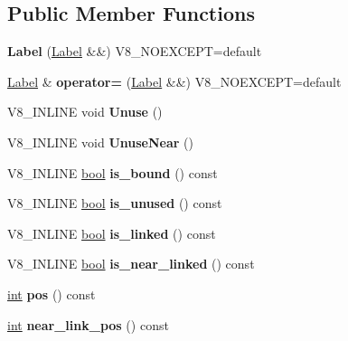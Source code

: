 \subsection*{Public Member Functions}
\begin{DoxyCompactItemize}
\item 
\mbox{\label{classv8_1_1internal_1_1Label_afd6e4efd594123dca09886540a98c827}} 
{\bfseries Label} (\mbox{\hyperlink{classv8_1_1internal_1_1Label}{Label}} \&\&) V8\+\_\+\+N\+O\+E\+X\+C\+E\+PT=default
\item 
\mbox{\label{classv8_1_1internal_1_1Label_a626fe1cbe2506760bfc536fc6ff1b01a}} 
\mbox{\hyperlink{classv8_1_1internal_1_1Label}{Label}} \& {\bfseries operator=} (\mbox{\hyperlink{classv8_1_1internal_1_1Label}{Label}} \&\&) V8\+\_\+\+N\+O\+E\+X\+C\+E\+PT=default
\item 
\mbox{\label{classv8_1_1internal_1_1Label_ab0f5ce9a92345aca188bbc3fdb35e093}} 
V8\+\_\+\+I\+N\+L\+I\+NE void {\bfseries Unuse} ()
\item 
\mbox{\label{classv8_1_1internal_1_1Label_aad88255cdf3ad753e4a004b74ac9bb7b}} 
V8\+\_\+\+I\+N\+L\+I\+NE void {\bfseries Unuse\+Near} ()
\item 
\mbox{\label{classv8_1_1internal_1_1Label_af4b1bc535d3a7527cd84f1d027b03066}} 
V8\+\_\+\+I\+N\+L\+I\+NE \mbox{\hyperlink{classbool}{bool}} {\bfseries is\+\_\+bound} () const
\item 
\mbox{\label{classv8_1_1internal_1_1Label_a186bd129567553c8124668a5fd3f735f}} 
V8\+\_\+\+I\+N\+L\+I\+NE \mbox{\hyperlink{classbool}{bool}} {\bfseries is\+\_\+unused} () const
\item 
\mbox{\label{classv8_1_1internal_1_1Label_ab0f9bcf1d4b23420911717b584811250}} 
V8\+\_\+\+I\+N\+L\+I\+NE \mbox{\hyperlink{classbool}{bool}} {\bfseries is\+\_\+linked} () const
\item 
\mbox{\label{classv8_1_1internal_1_1Label_a6d9831e3202f81844c0e8d6c505f4870}} 
V8\+\_\+\+I\+N\+L\+I\+NE \mbox{\hyperlink{classbool}{bool}} {\bfseries is\+\_\+near\+\_\+linked} () const
\item 
\mbox{\label{classv8_1_1internal_1_1Label_ae2cffd9581776bae428a19f3889a2321}} 
\mbox{\hyperlink{classint}{int}} {\bfseries pos} () const
\item 
\mbox{\label{classv8_1_1internal_1_1Label_a8f2e208c4103e5cfbe1cdad48c5f35a7}} 
\mbox{\hyperlink{classint}{int}} {\bfseries near\+\_\+link\+\_\+pos} () const
\end{DoxyCompactItemize}
